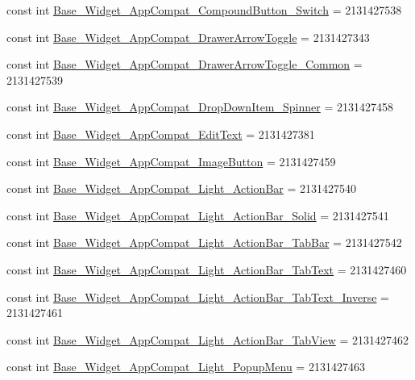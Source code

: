 \begin{CompactItemize}
const int \hyperlink{class__2doo_1_1_droid_1_1_resource_1_1_style_6a7bf6e1d478b56df005864cc983e5b7}{Base\_\-Widget\_\-AppCompat\_\-CompoundButton\_\-Switch} = 2131427538
\item 
const int \hyperlink{class__2doo_1_1_droid_1_1_resource_1_1_style_a127e28768804d9bd9dccd3973a9a3d6}{Base\_\-Widget\_\-AppCompat\_\-DrawerArrowToggle} = 2131427343
\item 
const int \hyperlink{class__2doo_1_1_droid_1_1_resource_1_1_style_09fe566af692f2747841910f089a39f7}{Base\_\-Widget\_\-AppCompat\_\-DrawerArrowToggle\_\-Common} = 2131427539
\item 
const int \hyperlink{class__2doo_1_1_droid_1_1_resource_1_1_style_9b485c2e0e022a540c4f16146dbda657}{Base\_\-Widget\_\-AppCompat\_\-DropDownItem\_\-Spinner} = 2131427458
\item 
const int \hyperlink{class__2doo_1_1_droid_1_1_resource_1_1_style_456ba87c93fbe39ac186573c46674ee6}{Base\_\-Widget\_\-AppCompat\_\-EditText} = 2131427381
\item 
const int \hyperlink{class__2doo_1_1_droid_1_1_resource_1_1_style_9d6208ee586f1787b80600c1e26b4acd}{Base\_\-Widget\_\-AppCompat\_\-ImageButton} = 2131427459
\item 
const int \hyperlink{class__2doo_1_1_droid_1_1_resource_1_1_style_a195dff59f2c1bae99925a91edeca94b}{Base\_\-Widget\_\-AppCompat\_\-Light\_\-ActionBar} = 2131427540
\item 
const int \hyperlink{class__2doo_1_1_droid_1_1_resource_1_1_style_0fed5f9c5217c5f100982be3e74a1fae}{Base\_\-Widget\_\-AppCompat\_\-Light\_\-ActionBar\_\-Solid} = 2131427541
\item 
const int \hyperlink{class__2doo_1_1_droid_1_1_resource_1_1_style_eff3cbd2b898960962bd255927c85bea}{Base\_\-Widget\_\-AppCompat\_\-Light\_\-ActionBar\_\-TabBar} = 2131427542
\item 
const int \hyperlink{class__2doo_1_1_droid_1_1_resource_1_1_style_f6d93b2cbd521fe6eab9d55b5c60db1a}{Base\_\-Widget\_\-AppCompat\_\-Light\_\-ActionBar\_\-TabText} = 2131427460
\item 
const int \hyperlink{class__2doo_1_1_droid_1_1_resource_1_1_style_7d7b1373f297e0ae9a47510770f6a154}{Base\_\-Widget\_\-AppCompat\_\-Light\_\-ActionBar\_\-TabText\_\-Inverse} = 2131427461
\item 
const int \hyperlink{class__2doo_1_1_droid_1_1_resource_1_1_style_091f5aba103958f32d880f7d6edf2815}{Base\_\-Widget\_\-AppCompat\_\-Light\_\-ActionBar\_\-TabView} = 2131427462
\item 
const int \hyperlink{class__2doo_1_1_droid_1_1_resource_1_1_style_365399052de9c559c7a4e9781554b44b}{Base\_\-Widget\_\-AppCompat\_\-Light\_\-PopupMenu} = 2131427463

\end{CompactItemize}
